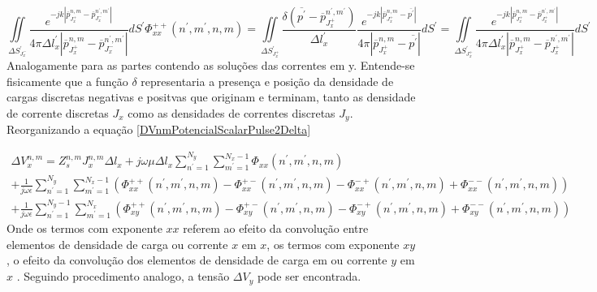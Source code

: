 \documentclass[
	12pt,				%
	openright,			%
	oneside,			%
	a4paper,			%
	english,			%
	brazil				%
	]{abntex2}
\begin{document}
\begin{apendicesenv}
\begin{subequations}
\begin{equation}
  \iint\limits_{{\Delta S}^{'}_{J_x^{-}}}  \frac{e^{-j k |\overline{p}_{J_{x}^{+}}^{n,m}-\overline{p}_{J_{x}^{-}}^{n^{'},m^{'}}|}}{4 \pi {\Delta l}_x^{'} |\overline{p}_{J_{x}^{+}}^{n,m}-\overline{p}_{J_{x}^{-}}^{n^{'},m^{'}}|} dS^{'}
\end{equation}
\begin{equation}
    \Phi_{xx}^{++}(n^{'},m^{'},n,m)=\iint\limits_{{\Delta S}^{'}_{J_x^{+}}}     \frac{ \delta(\overline{p^{'}}-\overline{p}^{n^{'},m^{'}}_{J_x^{+}})}{{\Delta l}_x^{'} } \frac{e^{-j k |\overline{p}_{{J_x^{+}}}^{n,m}-\overline{p^{'}}|}}{4 \pi |\overline{p}_{{J_x^{+}}}^{n,m}-\overline{p^{'}}|} dS^{'}  =
 \iint\limits_{{\Delta S}^{'}_{J_x^{+}}}    \frac{e^{-j k |\overline{p}_{J_{x}^{+}}^{n,m}-\overline{p}_{J_{x}^{+}}^{n^{'},m^{'}}|}}{4 \pi {\Delta l}_x^{'} |\overline{p}_{J_{x}^{+}}^{n,m}-\overline{p}_{J_{x}^{+}}^{n^{'},m^{'}}|} dS^{'}
\end{equation}
\end{subequations}
Analogamente para as partes contendo as soluções das correntes em y.
Entende-se fisicamente que a função $\delta$ representaria a presença e posição da densidade de cargas discretas negativas e positvas que originam e terminam, tanto as densidade de corrente discretas $J_x$ como as  densidades de correntes discretas $J_y$. Reorganizando a equação \ref{DVnmPotencialScalarPulse2Delta}

\begin{equation}\label{TensãoCadaElementoNM}
\begin{aligned}
    \Delta V_{x}^{n,m}=Z_s^{n,m}  J_{x}^{n,m} \Delta l_x 
    + 
    j\omega \mu  \Delta l_x \sum^{N_y}_{n^{'}=1} \sum^{N_x -1}_{m^{'}=1} \Phi_{xx}(n^{'},m^{'},n,m) \\  
    +
    \frac{1}{j \omega \epsilon} \sum^{N_y}_{n^{'}=1} \sum^{N_x -1}_{m^{'}=1}(\Phi_{xx}^{++}(n^{'},m^{'},n,m)-\Phi_{xx}^{+-}(n^{'},m^{'},n,m)-\Phi_{xx}^{-+}(n^{'},m^{'},n,m)+\Phi_{xx}^{--}(n^{'},m^{'},n,m)) \\
    +
    \frac{1}{j \omega \epsilon} \sum^{N_y-1}_{n^{'}=1} \sum^{N_x}_{m^{'}=1}(\Phi_{xy}^{++}(n^{'},m^{'},n,m)-\Phi_{xy}^{+-}(n^{'},m^{'},n,m)-\Phi_{xy}^{-+}(n^{'},m^{'},n,m)+\Phi_{xy}^{--}(n^{'},m^{'},n,m))
\end{aligned}
\end{equation}
Onde os termos com exponente $xx$ referem ao efeito da convolução entre elementos de densidade de carga ou corrente $x$ em $x$,  os termos com exponente $xy$, o efeito da convolução dos elementos de densidade de carga em ou corrente $y$ em $x$ . Seguindo procedimento analogo, a tensão $\Delta V_y$ pode ser encontrada. 

\end{apendicesenv}
\end{document}
